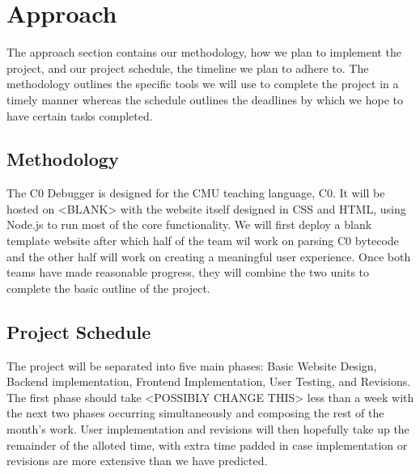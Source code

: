\documentclass[11pt]{article}
\begin{document}
\section{Approach}
\par
The approach section contains our methodology, how we plan to implement the project,
and our project schedule, the timeline we plan to adhere to.
The methodology outlines the specific tools we will use to complete the project in a
timely manner whereas the schedule outlines the deadlines by which we hope to have
certain tasks completed.

\subsection{Methodology}
The C0 Debugger is designed for the CMU teaching language, C0.
It will be hosted on <BLANK> with the website itself designed in CSS and HTML,
using Node.js to run most of the core functionality.
We will first deploy a blank template website after which half of the team wil work on
parsing C0 bytecode and the other half will work on creating a meaningful user experience.
Once both teams have made reasonable progress, they will combine the two units to
complete the basic outline of the project.

\subsection{Project Schedule}
The project will be separated into five main phases: Basic Website Design,
Backend implementation, Frontend Implementation, User Testing, and Revisions.
The first phase should take <POSSIBLY CHANGE THIS> less than a week with the
next two phases occurring simultaneously and composing the rest of the month's work.
User implementation and revisions will then hopefully take up the remainder of the
alloted time, with extra time padded in case implementation or revisions are more
extensive than we have predicted.
\end{document}
